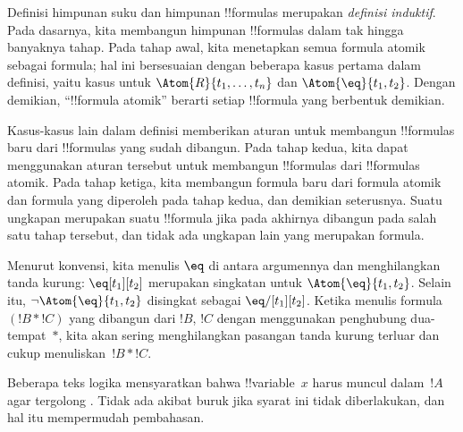 \documentclass[../../../include/open-logic-section]{subfiles}
\begin{document}
\begin{explain}
Definisi himpunan suku dan himpunan !!{formula}s merupakan
\emph{definisi induktif}. Pada dasarnya, kita membangun himpunan
!!{formula}s dalam tak hingga banyaknya tahap. Pada tahap awal, kita
menetapkan semua formula atomik sebagai formula; hal ini bersesuaian dengan
beberapa kasus pertama dalam definisi, yaitu kasus untuk
%
%
$\Atom{R}{t_1,\dots,t_n}$ dan $\Atom{\eq}{t_1,t_2}$. Dengan demikian,
``!!{formula} atomik'' berarti setiap !!{formula} yang berbentuk demikian.

Kasus-kasus lain dalam definisi memberikan aturan untuk membangun
!!{formula}s baru dari !!{formula}s yang sudah dibangun. Pada tahap kedua,
kita dapat menggunakan aturan tersebut untuk membangun !!{formula}s dari
!!{formula}s atomik. Pada tahap ketiga, kita membangun formula baru dari
formula atomik dan formula yang diperoleh pada tahap kedua, dan demikian
seterusnya. Suatu ungkapan merupakan suatu !!{formula} jika pada akhirnya
dibangun pada salah satu tahap tersebut, dan tidak ada ungkapan lain yang
merupakan formula.
\end{explain}

Menurut konvensi, kita menulis $\eq$ di antara argumennya dan menghilangkan
tanda kurung: $\eq[t_1][t_2]$ merupakan singkatan untuk
$\Atom{\eq}{t_1,t_2}$. Selain itu, $\lnot \Atom{\eq}{t_1,t_2}$ disingkat
sebagai $\eq/[t_1][t_2]$. Ketika menulis formula $(!B \ast !C)$ yang
dibangun dari $!B$, $!C$ dengan menggunakan penghubung dua-tempat~$\ast$,
kita akan sering menghilangkan pasangan tanda kurung terluar dan cukup
menuliskan~$!B \ast !C$.

\begin{intro}
Beberapa teks logika mensyaratkan bahwa !!{variable}~$x$ harus muncul
dalam~$!A$ agar
%
%
%
tergolong
.
Tidak ada akibat buruk jika syarat ini tidak diberlakukan, dan hal itu
mempermudah pembahasan.
\end{intro}
\end{document}
